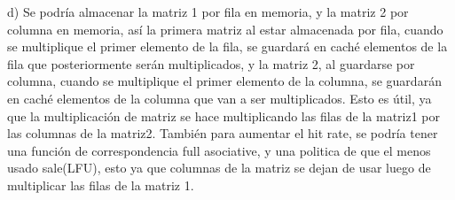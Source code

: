 \documentclass[letter]{article}
\begin{document}
\begin{pregunta}{2}
$$ $$

d) Se podría almacenar la matriz 1 por fila en memoria, y la matriz 2 por columna en memoria, así la primera matriz al estar almacenada por fila, cuando se multiplique el primer elemento de la fila, se guardará en caché elementos de la fila que posteriormente serán multiplicados, y la matriz 2, al guardarse por columna, cuando se multiplique el primer elemento de la columna, se guardarán en caché elementos de la columna que van a ser multiplicados. Esto es útil, ya que la multiplicación de matriz se hace multiplicando las filas de la matriz1 por las columnas de la matriz2. También para aumentar el hit rate, se podría tener una función de correspondencia full asociative, y una politica de que el menos usado sale(LFU), esto ya que columnas de la matriz se dejan de usar luego de multiplicar las filas de la matriz 1.

$$ $$
\end{pregunta}
	
\end{document}
